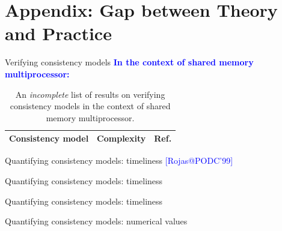 \documentclass{beamer}
\makeatletter
\newcommand{\citeinbeamer}[3]{{\scriptsize{\textcolor{blue}{[#1@#2'#3]}}}}
\makeatother
\begin{document}
\section{Appendix: Gap between Theory and Practice}

\begin{frame}{Verifying consistency models}
  \textcolor{blue}{\bf In the context of shared memory multiprocessor:}

  \begin{table}
	\begin{tabular}{|c|c|c|}
      \hline
      {\bf \large Consistency model} & {\bf \large Complexity} & {\bf \large
      Ref.}
      \\ \hline  \hline
	\end{tabular}
	\caption{An {\it incomplete} list of results on verifying consistency models in
	the context of shared memory multiprocessor.}
  \end{table}
\end{frame}
\begin{frame}[label = quantify-timeliness-backup]{Quantifying consistency
models: timeliness}
  \citeinbeamer{Rojas}{PODC}{99}
  \hyperlink{quantify-main}{}
\end{frame}
\begin{frame}{Quantifying consistency models: timeliness}

\end{frame}
\begin{frame}{Quantifying consistency models: timeliness}

\end{frame}
\begin{frame}[label = quantify-numerical-values-backup]{Quantifying consistency
models: numerical values}
  \hyperlink{quantify-main}{}
\end{frame}
\end{document}

